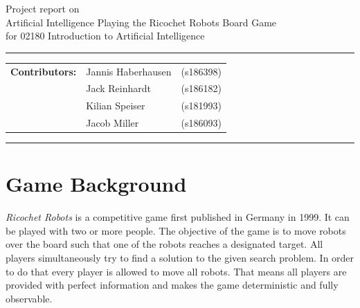 \documentclass[a4paper,10pt]{article}
\begin{document}
\begin{center}
Project report on\\
\vspace{0.5cm}
{{\Large \sc Artificial Intelligence Playing the Ricochet Robots Board Game}} \\
\vspace{0.5cm} for 02180 Introduction to Artificial Intelligence
\end{center}
\rule{\textwidth}{0.5pt}
\begin{description}
\item\begin{tabular}{rll}
    \textbf{Contributors:}  & Jannis Haberhausen  & (s186398) \\ 
                            & Jack Reinhardt      & (s186182) \\ 
                            & Kilian Speiser      & (s181993) \\ 
                            & Jacob Miller        & (s186093) \\
\end{tabular}
\end{description}
\rule{\textwidth}{1pt}

\tableofcontents
\thispagestyle{empty}
\newpage

\section{Game Background}
\textit{Ricochet Robots} is a competitive game first published in Germany in 1999. It can be played with two or more people. The objective of the game is to move robots over the board such that one of the robots reaches a designated target. All players simultaneously try to find a solution to the given search problem. In order to do that every player is allowed to move all robots. That means all players are provided with perfect information and makes the game deterministic and fully observable. 
\end{document}
